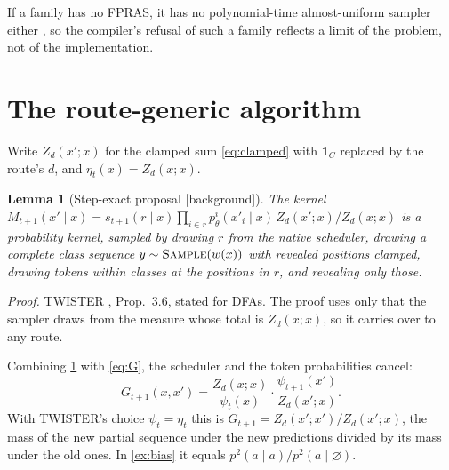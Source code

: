 \documentclass[11pt]{article}
\newtheorem{lemma}[theorem]{Lemma}
\theoremstyle{definition}
\newcommand{\one}{\mathbf{1}}
\newcommand{\op}[1]{\textup{\textsc{#1}}}
\newcommand{\status}[1]{\textsf{\small[#1]}}
\newcommand{\proofref}[1]{\par\noindent\textit{Proof.} #1\par\smallskip}
\begin{document}
If a family has no FPRAS, it has no polynomial-time almost-uniform sampler either \cite{jvv86}, so the compiler's
refusal of such a family reflects a limit of the problem, not of the implementation.

\section{The route-generic algorithm}\label{sec:traj}

Write $Z_d(x';x)$ for the clamped sum \eqref{eq:clamped} with $\one_C$ replaced by the route's $d$, and
$\eta_t(x)=Z_d(x;x)$.

\begin{lemma}[Step-exact proposal \status{background}]\label{lem:prop}
The kernel
$M_{t+1}(x'\mid x)=s_{t+1}(r\mid x)\prod_{i\in r}p^i_\theta(x'_i\mid x)\,Z_d(x';x)/Z_d(x;x)$
is a probability kernel, sampled by drawing $r$ from the native scheduler, drawing a complete class sequence
$y\sim\op{Sample}(w(x))$ with revealed positions clamped, drawing tokens within classes at the positions in $r$,
and revealing only those.
\end{lemma}
\proofref{TWISTER \cite{twister}, Prop.~3.6, stated for DFAs. The proof uses only that the sampler draws from the
measure whose total is $Z_d(x;x)$, so it carries over to any route.}

Combining \cref{lem:prop} with \eqref{eq:G}, the scheduler and the token probabilities cancel:
\begin{equation}\label{eq:potential}
  G_{t+1}(x,x')=\frac{Z_d(x;x)}{\psi_t(x)}\cdot\frac{\psi_{t+1}(x')}{Z_d(x';x)}.
\end{equation}
With TWISTER's choice $\psi_t=\eta_t$ this is $G_{t+1}=Z_d(x';x')/Z_d(x';x)$, the mass of the new partial sequence
under the new predictions divided by its mass under the old ones. In \cref{ex:bias} it equals
$p^2(a\mid a)/p^2(a\mid\varnothing)$.
\end{document}

